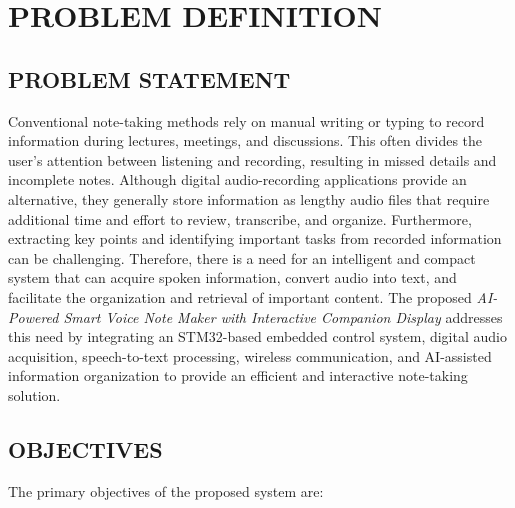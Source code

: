 \documentclass[a4paper,12pt,oneside]{report}
\begin{document}
\chapter{PROBLEM DEFINITION}

\section{PROBLEM STATEMENT}

Conventional note-taking methods rely on manual writing or typing
to record information during lectures, meetings, and discussions.
This often divides the user's attention between listening and
recording, resulting in missed details and incomplete notes.
Although digital audio-recording applications provide an alternative,
they generally store information as lengthy audio files that require
additional time and effort to review, transcribe, and organize.
Furthermore, extracting key points and identifying important tasks
from recorded information can be challenging. Therefore, there is
a need for an intelligent and compact system that can acquire
spoken information, convert audio into text, and facilitate the
organization and retrieval of important content. The proposed
\textit{AI-Powered Smart Voice Note Maker with Interactive
Companion Display} addresses this need by integrating an STM32-based
embedded control system, digital audio acquisition, speech-to-text
processing, wireless communication, and AI-assisted information
organization to provide an efficient and interactive note-taking
solution.

\section{OBJECTIVES}

The primary objectives of the proposed system are:
\end{document}
